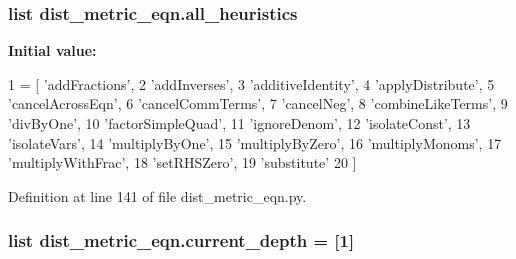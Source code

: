 \subsubsection[{all\+\_\+heuristics}]{\setlength{\rightskip}{0pt plus 5cm}list dist\+\_\+metric\+\_\+eqn.\+all\+\_\+heuristics}\label{namespacedist__metric__eqn_a6ed7ee3e88472aac349189bc8e620026}
{\bfseries Initial value\+:}
\begin{DoxyCode}
1 = [ \textcolor{stringliteral}{'addFractions'},
2                     \textcolor{stringliteral}{'addInverses'},
3                     \textcolor{stringliteral}{'additiveIdentity'},
4                     \textcolor{stringliteral}{'applyDistribute'},
5                     \textcolor{stringliteral}{'cancelAcrossEqn'},
6                     \textcolor{stringliteral}{'cancelCommTerms'},
7                     \textcolor{stringliteral}{'cancelNeg'},
8                     \textcolor{stringliteral}{'combineLikeTerms'},
9                     \textcolor{stringliteral}{'divByOne'},
10                     \textcolor{stringliteral}{'factorSimpleQuad'},
11                     \textcolor{stringliteral}{'ignoreDenom'},
12                     \textcolor{stringliteral}{'isolateConst'},
13                     \textcolor{stringliteral}{'isolateVars'},
14                     \textcolor{stringliteral}{'multiplyByOne'},
15                     \textcolor{stringliteral}{'multiplyByZero'},
16                     \textcolor{stringliteral}{'multiplyMonoms'},
17                     \textcolor{stringliteral}{'multiplyWithFrac'},
18                     \textcolor{stringliteral}{'setRHSZero'},
19                     \textcolor{stringliteral}{'substitute'}
20                 ]
\end{DoxyCode}


Definition at line 141 of file dist\+\_\+metric\+\_\+eqn.\+py.

\hypertarget{namespacedist__metric__eqn_a684e63911b91cc150a8c6e7ace89ea78}{}
\subsubsection[{current\+\_\+depth}]{\setlength{\rightskip}{0pt plus 5cm}list dist\+\_\+metric\+\_\+eqn.\+current\+\_\+depth = \mbox{[}1\mbox{]}}\label{namespacedist__metric__eqn_a684e63911b91cc150a8c6e7ace89ea78}


